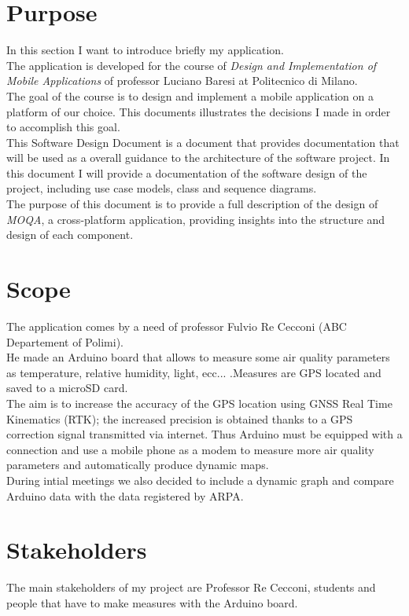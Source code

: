 \section{Purpose}
In this section I want to introduce briefly my application.\\

The application is developed for the course of \textit{Design and Implementation of Mobile
Applications} of professor Luciano Baresi at Politecnico di Milano.\\
The goal of the course is to design and implement a mobile application on a platform of our choice.
This documents illustrates the decisions I made in order to accomplish this goal.\\

This Software Design Document is a document that provides documentation that will be
used as a overall guidance to the architecture of the software project. In this document I will
provide a documentation of the software design of the project, including use case models,
class and sequence diagrams.\\

The purpose of this document is to provide a full description of the design of \textit{MOQA}, a cross-platform application, providing insights into the structure and design of each component.

\section{Scope}
The application comes by a need of professor Fulvio Re Cecconi (ABC Departement of Polimi).\\
He made an Arduino board that allows to measure some
air quality parameters as temperature, relative humidity, light, ecc... .Measures are GPS located and saved to a microSD card.\\

The aim is to increase the accuracy of the GPS location using GNSS Real Time Kinematics (RTK); the increased precision is obtained thanks to a GPS correction signal transmitted via internet. Thus Arduino must be equipped with a connection and use a mobile phone as a modem to measure more air quality parameters and automatically produce dynamic maps.\\

During intial meetings we also decided to include a dynamic graph and compare Arduino data with the data registered by ARPA.

\section{Stakeholders}
The main stakeholders of my project are Professor Re Cecconi, students and people that have to make measures with the Arduino board.\\

